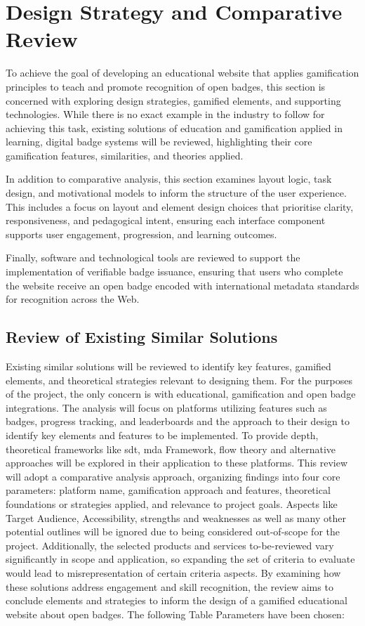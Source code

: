 \section{Design Strategy and Comparative Review}
To achieve the goal of developing an educational website that applies gamification principles to teach and promote recognition of open badges, this section is concerned with exploring design strategies, gamified elements, and supporting technologies.
While there is no exact example in the industry to follow for achieving this task, existing solutions of education and gamification applied in learning, digital badge systems will be reviewed, highlighting their core gamification features, similarities, and theories applied.

In addition to comparative analysis, this section examines layout logic, task design, and motivational models to inform the structure of the user experience. 
This includes a focus on layout and element design choices that prioritise clarity, responsiveness, and pedagogical intent, ensuring each interface component supports user engagement, progression, and learning outcomes.

Finally, software and technological tools are reviewed to support the implementation of verifiable badge issuance, ensuring that users who complete the website receive an open badge encoded with international metadata standards for recognition across the Web.

\subsection{Review of Existing Similar Solutions}
Existing similar solutions will be reviewed to identify key features, gamified elements, and theoretical strategies relevant to designing them. 
For the purposes of the project, the only concern is with educational, gamification and open badge integrations. 
The analysis will focus on platforms utilizing features such as badges, progress tracking, and leaderboards and the approach to their design to identify key elements and features to be implemented. 
To provide depth, theoretical frameworks like \acrshort{sdt}, \acrshort{mda} Framework, flow theory and alternative approaches will be explored in their application to these platforms. 
This review will adopt a comparative analysis approach, organizing findings into four core parameters: platform name, gamification approach and features, theoretical foundations or strategies applied, and relevance to project goals. 
Aspects like Target Audience, Accessibility, strengths and weaknesses as well as many other potential outlines will be ignored due to being considered out-of-scope for the project. 
Additionally, the selected products and services to-be-reviewed vary significantly in scope and application, so expanding the set of criteria to evaluate would lead to misrepresentation of certain criteria aspects.
By examining how these solutions address engagement and skill recognition, the review aims to conclude elements and strategies to inform the design of a gamified educational website about open badges. 
The following Table Parameters have been chosen:

